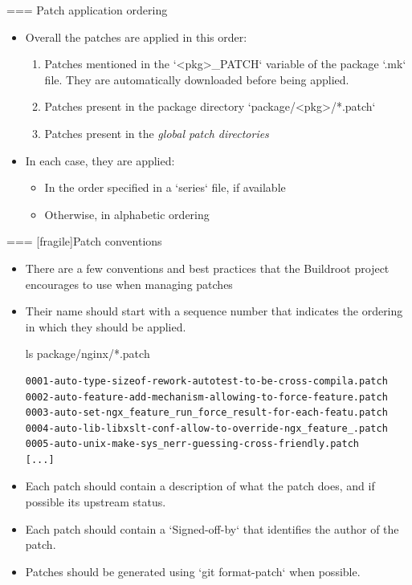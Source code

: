 === {Patch application ordering}
  \begin{itemize}
  \item Overall the patches are applied in this order:
    \begin{enumerate}
    \item Patches mentioned in the `<pkg>_PATCH` variable of the
      package `.mk` file. They are automatically downloaded
      before being applied.
    \item Patches present in the package directory
      `package/<pkg>/*.patch`
    \item Patches present in the {\em global patch directories}
    \end{enumerate}
  \item In each case, they are applied:
    \begin{itemize}
    \item In the order specified in a `series` file, if available
    \item Otherwise, in alphabetic ordering
    \end{itemize}
  \end{itemize}


=== [fragile]{Patch conventions}
  \begin{itemize}
  \item There are a few conventions and best practices that the
    Buildroot project encourages to use when managing patches
  \item Their name should start with a sequence number that
    indicates the ordering in which they should be applied.
    \begin{block}{ls package/nginx/*.patch}
      {\scriptsize
\begin{verbatim}
0001-auto-type-sizeof-rework-autotest-to-be-cross-compila.patch
0002-auto-feature-add-mechanism-allowing-to-force-feature.patch
0003-auto-set-ngx_feature_run_force_result-for-each-featu.patch
0004-auto-lib-libxslt-conf-allow-to-override-ngx_feature_.patch
0005-auto-unix-make-sys_nerr-guessing-cross-friendly.patch
[...]
\end{verbatim}}
      \end{block}
    \item Each patch should contain a description of what the patch
      does, and if possible its upstream status.
    \item Each patch should contain a `Signed-off-by` that
      identifies the author of the patch.
    \item Patches should be generated using
      `git format-patch` when possible.
    \end{itemize}



